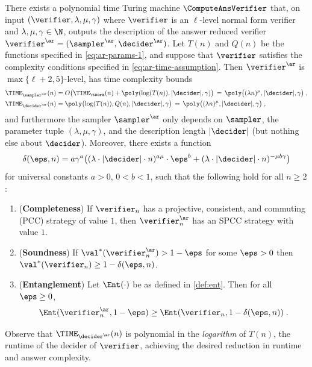 \begin{theorem}\label{thm:ar}
  There exists a polynomial time Turing machine $\ComputeAnsVerifier$ that, on
  input $(\verifier, \lambda, \mu, \gamma)$ where $\verifier$ is an $\ell$-level
  normal form verifier and $\lambda, \mu, \gamma \in \N$, outputs the
  description of the answer reduced verifier $\vans = (\sans, \dans)$.
  Let $T(n)$ and $Q(n)$ be the functions specified in \cref{eq:ar-params-1}, and
  suppose that $\verifier$ satisfies the complexity conditions specified in
  \cref{eq:ar-time-assumption}.
  Then $\vans$ is $\max\{\ell+2, 5\}$-level, has time complexity bounds
  \begin{align*}
    \TIME_{\sans}(n)
    & = O \bigl( \TIME_{\tsora}(n) + \poly(\log(T(n)),|\decider|,\gamma) \bigr) 
     \,=\, \poly\bigl( (\lambda n)^\mu, |\decider|,\gamma \bigr)\;,\\
    \TIME_{\dans}(n)
    & = \poly \bigl( \log(T(n)),Q(n),|\decider|,\gamma \bigr) \,=\,
      \poly\bigl( (\lambda n)^\mu, |\decider|,\gamma \bigr)\;,
  \end{align*}
  and furthermore the sampler $\sampler^\ar$ only depends on
  $\sampler$, the parameter tuple $(\lambda, \mu, \gamma)$, and the description
  length $|\decider|$ (but nothing else about $\decider$).
	Moreover, there exists a function
  \begin{equation*}
    \delta(\eps, n) = a \gamma^a \bigl( (\lambda \cdot |\decider| \cdot n)^{a \mu}
    \cdot \eps^b + (\lambda \cdot |\decider| \cdot n)^{-\mu b\gamma} \bigr)
  \end{equation*}
  for universal constants $a>0$, $0<b<1$, such that the following hold for all $n \geq 2$:
  \begin{enumerate}
  \item (\textbf{Completeness}) If $\verifier_n$ has a projective, consistent,
    and commuting (PCC) strategy of value $1$, then $\vans_n$
    has an SPCC strategy with value $1$.
    \label{enu:ar-completeness}
	\item (\textbf{Soundness}) If $\val^*(\vans_n) > 1 - \eps$ for some $\eps > 0$
    then $\val^*(\verifier_n) \geq 1 - \delta(\eps, n)$.\label{enu:ar-soundness}
  \item (\textbf{Entanglement}) Let $\Ent(\cdot)$ be as defined in \cref{def:ent}.
    Then for all $\eps\geq 0$,
    \begin{equation*}
      \Ent(\vans_n, 1 - \eps) \geq \Ent(\verifier_{n}, 1 - \delta(\eps, n))\;.
    \end{equation*}
  \end{enumerate}
\end{theorem}
Observe that $\TIME_{\dans}(n)$ is polynomial in the \emph{logarithm}
of $T(n)$, the runtime of the decider of $\verifier$, achieving the
desired reduction in runtime and answer complexity.

